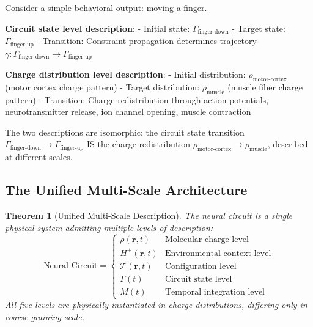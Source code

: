 \documentclass[aps,prd,twocolumn,superscriptaddress,floatfix,nofootinbib]{revtex4-2}
\newtheorem{theorem}{Theorem}[section]
\theoremstyle{remark}
\begin{document}
\begin{example}
\label{ex:behavior_charge}
Consider a simple behavioral output: moving a finger.

\textbf{Circuit state level description}:
- Initial state: $\Gamma_{\text{finger-down}}$
- Target state: $\Gamma_{\text{finger-up}}$
- Transition: Constraint propagation determines trajectory $\gamma: \Gamma_{\text{finger-down}} \to \Gamma_{\text{finger-up}}$

\textbf{Charge distribution level description}:
- Initial distribution: $\rho_{\text{motor-cortex}}$ (motor cortex charge pattern)
- Target distribution: $\rho_{\text{muscle}}$ (muscle fiber charge pattern)
- Transition: Charge redistribution through action potentials, neurotransmitter release, ion channel opening, muscle contraction

The two descriptions are isomorphic: the circuit state transition $\Gamma_{\text{finger-down}} \to \Gamma_{\text{finger-up}}$ IS the charge redistribution $\rho_{\text{motor-cortex}} \to \rho_{\text{muscle}}$, described at different scales.
\end{example}

\subsection{The Unified Multi-Scale Architecture}

\begin{theorem}[Unified Multi-Scale Description]
\label{thm:unified_architecture}
The neural circuit is a single physical system admitting multiple levels of description:
\begin{equation}
\text{Neural Circuit} = \begin{cases}
\rho(\mathbf{r}, t) & \text{Molecular charge level} \\
H^+(\mathbf{r}, t) & \text{Environmental context level} \\
\mathcal{T}(\mathbf{r}, t) & \text{Configuration level} \\
\Gamma(t) & \text{Circuit state level} \\
M(t) & \text{Temporal integration level}
\end{cases}
\end{equation}
All five levels are physically instantiated in charge distributions, differing only in coarse-graining scale.
\end{theorem}
\end{document}
